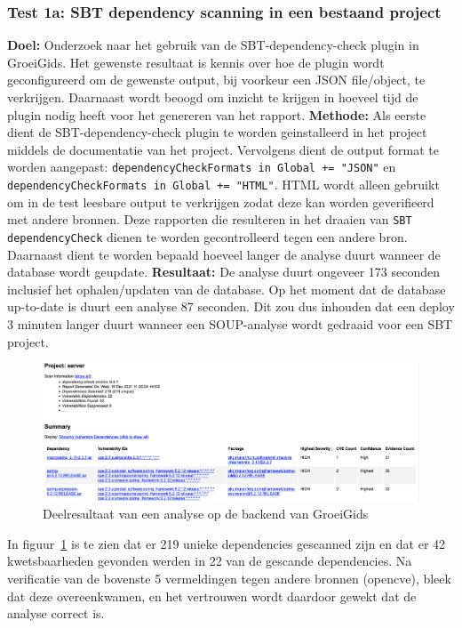 \subsubsection{Test 1a: SBT dependency scanning in een bestaand project}
\textbf{Doel:} Onderzoek naar het gebruik van de SBT-dependency-check plugin in GroeiGids. Het gewenste resultaat is kennis over hoe de plugin wordt geconfigureerd om de gewenste output, bij voorkeur een JSON file/object, te verkrijgen. Daarnaast wordt beoogd om inzicht te krijgen in hoeveel tijd de plugin nodig heeft voor het genereren van het rapport.
\textbf{Methode:} Als eerste dient de SBT-dependency-check plugin te worden geinstalleerd in het project middels de documentatie van het project. Vervolgens dient de output format te worden aangepast: \texttt{dependencyCheckFormats in Global += "JSON"}
en \texttt{dependencyCheckFormats in Global += "HTML"}. HTML wordt alleen gebruikt om in de test leesbare output te verkrijgen zodat deze kan worden geverifieerd met andere bronnen. Deze rapporten die resulteren in het draaien van \texttt{SBT dependencyCheck} dienen te worden gecontrolleerd tegen een andere bron. Daarnaast dient te worden bepaald hoeveel langer de analyse duurt wanneer de database wordt geupdate.
\textbf{Resultaat:} De analyse duurt ongeveer 173 seconden inclusief het ophalen/updaten van de database. Op het moment dat de database up-to-date is duurt een analyse 87 seconden. Dit zou dus inhouden dat een deploy 3 minuten langer duurt wanneer een SOUP-analyse wordt gedraaid voor een SBT project.
\begin{figure}[bth]
    \myfloatalign
    \includegraphics[width=15cm]{gfx/report_analyse_test1a_SBT}
    \caption{Deelresultaat van een analyse op de backend van GroeiGids}
    \label{fig:SBTReport1A}
\end{figure}

In figuur~\ref{fig:SBTReport1A} is te zien dat er 219 unieke dependencies gescanned zijn en dat er 42 kwetsbaarheden gevonden werden in 22 van de gescande dependencies. Na verificatie van de bovenste 5 vermeldingen tegen andere bronnen (opencve), bleek dat deze overeenkwamen, en het vertrouwen wordt daardoor gewekt dat de analyse correct is.

